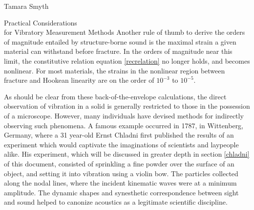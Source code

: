 \documentclass[a4paper,10pt]{report}
\numberwithin{equation}{section}
\begin{document}
\begin{chapter}{Tamara Smyth}
\begin{section}{Practical Considerations\\ for Vibratory Measurement Methods}
Another rule of thumb to derive the orders of magnitude entailed by structure-borne sound is the maximal strain a given material can withstand before fracture. In the orders of magnitude near this limit, the constitutive relation equation \eqref{recrelation} no longer holds, and becomes nonlinear. For most materials, the strains in the nonlinear region between fracture and Hookean linearity are on the order of $10^{-3}$ to $10^{-5}$. \cite[p.~16]{Ballantine1997}

As should be clear from these back-of-the-envelope calculations, the direct observation of vibration in a solid is generally restricted to those in the possession of a microscope. However, many individuals have devised methods for indirectly observing such phenomena. A famous example occurred in 1787, in Wittenberg, Germany, where a 31 year-old Ernst Chladni first published the results of an experiment which would captivate the imaginations of scientists and laypeople alike.\cite{Stockmann2007} \cite{Ullmann2007} His experiment, which will be discussed in greater depth in section \ref{chladni} of this document, consisted of sprinkling a fine powder over the surface of an object, and setting it into vibration using a violin bow. The particles collected along the nodal lines, where the incident kinematic waves were at a minimum amplitude. The dynamic shapes and synesthetic correspondence between sight and sound helped to canonize acoustics as a legitimate scientific discipline. 


\end{section}
\end{chapter}
\end{document}
